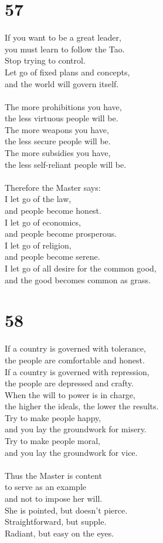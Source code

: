 \documentclass[b5paper, 12pt, oneside]{book}
\begin{document}
\chapter*{57}
If you want to be a great leader,\\
you must learn to follow the Tao.\\
Stop trying to control.\\
Let go of fixed plans and concepts,\\
and the world will govern itself.\\
\\
The more prohibitions you have,\\
the less virtuous people will be.\\
The more weapons you have,\\
the less secure people will be.\\
The more subsidies you have,\\
the less self-reliant people will be.\\
\\
Therefore the Master says:\\
I let go of the law,\\
and people become honest.\\
I let go of economics,\\
and people become prosperous.\\
I let go of religion,\\
and people become serene.\\
I let go of all desire for the common good,\\
and the good becomes common as grass.

\chapter*{58}
If a country is governed with tolerance,\\
the people are comfortable and honest.\\
If a country is governed with repression,\\
the people are depressed and crafty.
\\
When the will to power is in charge,\\
the higher the ideals, the lower the results.\\
Try to make people happy,\\
and you lay the groundwork for misery.\\
Try to make people moral,\\
and you lay the groundwork for vice.\\
\\
Thus the Master is content\\
to serve as an example\\
and not to impose her will.\\
She is pointed, but doesn't pierce.\\
Straightforward, but supple.\\
Radiant, but easy on the eyes.
\end{document}
